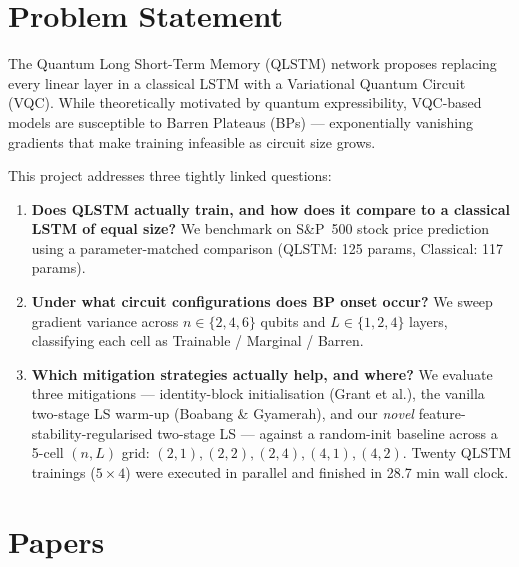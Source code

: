 \documentclass[11pt,a4paper]{article}
\begin{document}
\section{Problem Statement}

The Quantum Long Short-Term Memory (QLSTM) network proposes replacing every linear layer in a classical LSTM with a Variational Quantum Circuit (VQC). While theoretically motivated by quantum expressibility, VQC-based models are susceptible to Barren Plateaus (BPs) — exponentially vanishing gradients that make training infeasible as circuit size grows.

This project addresses three tightly linked questions:
\begin{enumerate}
  \item \textbf{Does QLSTM actually train, and how does it compare to a classical LSTM of equal size?} We benchmark on S\&P~500 stock price prediction using a parameter-matched comparison (QLSTM: 125 params, Classical: 117 params).
  \item \textbf{Under what circuit configurations does BP onset occur?} We sweep gradient variance across $n \in \{2,4,6\}$ qubits and $L \in \{1,2,4\}$ layers, classifying each cell as Trainable / Marginal / Barren.
  \item \textbf{Which mitigation strategies actually help, and where?} We evaluate three mitigations --- identity-block initialisation (Grant et al.), the vanilla two-stage LS warm-up (Boabang \& Gyamerah), and our \emph{novel} feature-stability-regularised two-stage LS --- against a random-init baseline across a 5-cell $(n,L)$ grid: $(2,1), (2,2), (2,4), (4,1), (4,2)$. Twenty QLSTM trainings ($5\times 4$) were executed in parallel and finished in 28.7 min wall clock.
\end{enumerate}

\section{Papers}
\end{document}
